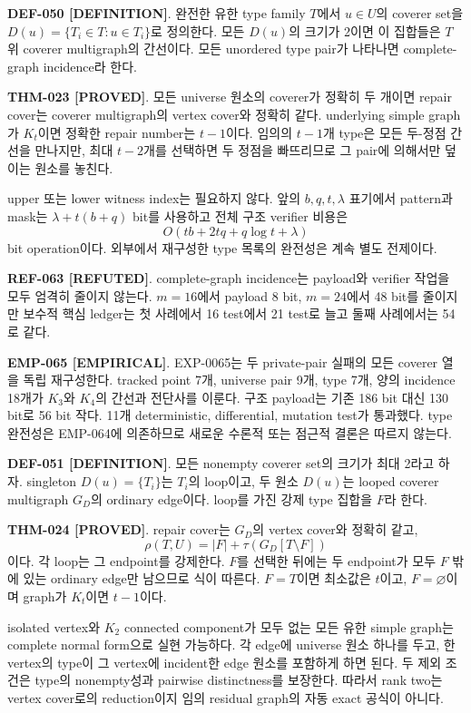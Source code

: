 \documentclass[11pt]{article}
\newcommand{\claimstatus}[2]{\textbf{#1 [#2]}}
\begin{document}
\claimstatus{DEF-050}{DEFINITION}.
완전한 유한 type family \(T\)에서 \(u\in U\)의 coverer set을
\(D(u)=\{T_i\in T:u\in T_i\}\)로 정의한다. 모든 \(D(u)\)의 크기가
2이면 이 집합들은 \(T\) 위 coverer multigraph의 간선이다. 모든
unordered type pair가 나타나면 complete-graph incidence라 한다.

\claimstatus{THM-023}{PROVED}.
모든 universe 원소의 coverer가 정확히 두 개이면 repair cover는
coverer multigraph의 vertex cover와 정확히 같다. underlying simple
graph가 \(K_t\)이면 정확한 repair number는 \(t-1\)이다. 임의의
\(t-1\)개 type은 모든 두-정점 간선을 만나지만, 최대 \(t-2\)개를
선택하면 두 정점을 빠뜨리므로 그 pair에 의해서만 덮이는 원소를
놓친다.

upper 또는 lower witness index는 필요하지 않다. 앞의
\(b,q,t,\lambda\) 표기에서 pattern과 mask는
\(\lambda+t(b+q)\) bit를 사용하고 전체 구조 verifier 비용은
\[
 O(tb+2tq+q\log t+\lambda)
\]
bit operation이다. 외부에서 재구성한 type 목록의 완전성은 계속
별도 전제이다.

\claimstatus{REF-063}{REFUTED}.
complete-graph incidence는 payload와 verifier 작업을 모두 엄격히
줄이지 않는다. \(m=16\)에서 payload 8 bit, \(m=24\)에서 48 bit를
줄이지만 보수적 핵심 ledger는 첫 사례에서 16 test에서 21 test로
늘고 둘째 사례에서는 54로 같다.

\claimstatus{EMP-065}{EMPIRICAL}.
EXP-0065는 두 private-pair 실패의 모든 coverer 열을 독립 재구성한다.
tracked point 7개, universe pair 9개, type 7개, 양의 incidence 18개가
\(K_3\)와 \(K_4\)의 간선과 전단사를 이룬다. 구조 payload는 기존
186 bit 대신 130 bit로 56 bit 작다. 11개 deterministic,
differential, mutation test가 통과했다. type 완전성은 EMP-064에
의존하므로 새로운 수론적 또는 점근적 결론은 따르지 않는다.

\claimstatus{DEF-051}{DEFINITION}.
모든 nonempty coverer set의 크기가 최대 2라고 하자.
singleton \(D(u)=\{T_i\}\)는 \(T_i\)의 loop이고, 두 원소
\(D(u)\)는 looped coverer multigraph \(G_D\)의 ordinary edge이다.
loop를 가진 강제 type 집합을 \(F\)라 한다.

\claimstatus{THM-024}{PROVED}.
repair cover는 \(G_D\)의 vertex cover와 정확히 같고,
\[
 \rho(T,U)=|F|+\tau\!\left(G_D[T\setminus F]\right)
\]
이다. 각 loop는 그 endpoint를 강제한다. \(F\)를 선택한 뒤에는 두
endpoint가 모두 \(F\) 밖에 있는 ordinary edge만 남으므로 식이
따른다. \(F=T\)이면 최소값은 \(t\)이고, \(F=\varnothing\)이며 graph가
\(K_t\)이면 \(t-1\)이다.

isolated vertex와 \(K_2\) connected component가 모두 없는 모든 유한
simple graph는 complete normal form으로 실현 가능하다. 각 edge에
universe 원소 하나를 두고, 한 vertex의 type이 그 vertex에 incident한
edge 원소를 포함하게 하면 된다. 두 제외 조건은 type의 nonempty성과
pairwise distinctness를 보장한다. 따라서 rank two는 vertex cover로의
reduction이지 임의 residual graph의 자동 exact 공식이 아니다.
\end{document}
